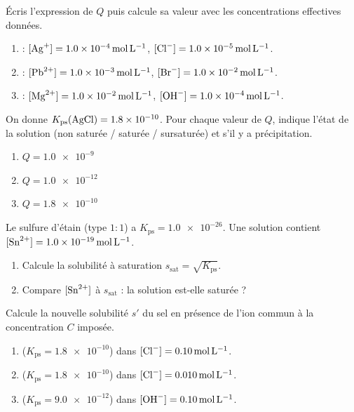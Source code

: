 \documentclass[11pt,a4paper]{article}
\begin{document}
\begin{exo}
Écris l'expression de $Q$ puis calcule sa valeur avec les concentrations effectives données.
\begin{enumerate}[label=\alph*)]
  \item {} : $[\ce{Ag+}]=\qty{1.0e-4}{\mole\per\litre}$, $[\ce{Cl-}]=\qty{1.0e-5}{\mole\per\litre}$.
  \item {} : $[\ce{Pb^{2+}}]=\qty{1.0e-3}{\mole\per\litre}$, $[\ce{Br-}]=\qty{1.0e-2}{\mole\per\litre}$.
  \item {} : $[\ce{Mg^{2+}}]=\qty{1.0e-2}{\mole\per\litre}$, $[\ce{OH-}]=\qty{1.0e-4}{\mole\per\litre}$.
\end{enumerate}
\end{exo}

\begin{exo}
On donne $K_{\mathrm{ps}}(\ce{AgCl})=\num{1.8e-10}$. Pour chaque valeur de $Q$, indique l'état de la
solution (non saturée / saturée / sursaturée) et s'il y a précipitation.
\begin{enumerate}[label=\alph*)]
  \item $Q=\num{1.0e-9}$
  \item $Q=\num{1.0e-12}$
  \item $Q=\num{1.8e-10}$
\end{enumerate}
\end{exo}

\begin{exo}
Le sulfure d'étain  (type $1{:}1$) a $K_{\mathrm{ps}}=\num{1.0e-26}$. Une solution contient
$[\ce{Sn^{2+}}]=\qty{1.0e-19}{\mole\per\litre}$.
\begin{enumerate}[label=\alph*)]
  \item Calcule la solubilité à saturation $s_{\text{sat}}=\sqrt{K_{\mathrm{ps}}}$.
  \item Compare $[\ce{Sn^{2+}}]$ à $s_{\text{sat}}$ : la solution est-elle saturée ?
\end{enumerate}
\end{exo}

\begin{exo}[effet d'ion commun : $s'=K_{\mathrm{ps}}/C^{n}$]
Calcule la nouvelle solubilité $s'$ du sel en présence de l'ion commun à la concentration $C$ imposée.
\begin{enumerate}[label=\alph*)]
  \item {} ($K_{\mathrm{ps}}=\num{1.8e-10}$) dans $[\ce{Cl-}]=\qty{0.10}{\mole\per\litre}$.
  \item {} ($K_{\mathrm{ps}}=\num{1.8e-10}$) dans $[\ce{Cl-}]=\qty{0.010}{\mole\per\litre}$.
  \item {} ($K_{\mathrm{ps}}=\num{9.0e-12}$) dans $[\ce{OH-}]=\qty{0.10}{\mole\per\litre}$.
\end{enumerate}
\end{exo}
\end{document}
